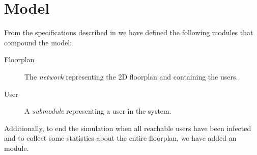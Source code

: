 \chapter{Model}\label{ch:model}

From the specifications described in  we have defined the
following modules that compound the model:
\begin{description}
	\item[Floorplan] The \emph{network} representing the 2D floorplan and
		containing the users.
	\item[User] A \emph{submodule} representing a user in the system.
\end{description}

Additionally, to end the simulation when all reachable users have been infected
and to collect some statistics about the entire floorplan, we have added an
 module.






